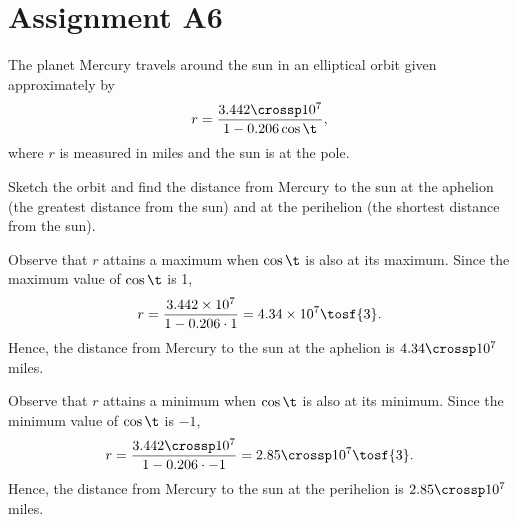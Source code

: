 \section{Assignment A6}

\begin{problem}
    The planet Mercury travels around the sun in an elliptical orbit given approximately by \[r = \dfrac{3.442 \crossp 10^7}{1 - 0.206\cos\t},\] where $r$ is measured in miles and the sun is at the pole.

    Sketch the orbit and find the distance from Mercury to the sun at the aphelion (the greatest distance from the sun) and at the perihelion (the shortest distance from the sun).
\end{problem}
\begin{solution}
    \begin{center}
    \end{center}

    Observe that $r$ attains a maximum when $\cos \t$ is also at its maximum. Since the maximum value of $\cos \t$ is 1, \[r = \dfrac{3.442 \times 10^7}{1 - 0.206\cdot1} = 4.34 \times 10^7 \tosf{3}.\] Hence, the distance from Mercury to the sun at the aphelion is $4.34 \crossp 10^7$ miles.

    Observe that $r$ attains a minimum when $\cos \t$ is also at its minimum. Since the minimum value of $\cos \t$ is $-1$, \[r = \dfrac{3.442 \crossp 10^7}{1 - 0.206\cdot-1} = 2.85 \crossp 10^7 \tosf{3}.\] Hence, the distance from Mercury to the sun at the perihelion is $2.85 \crossp 10^7$ miles.
\end{solution}

